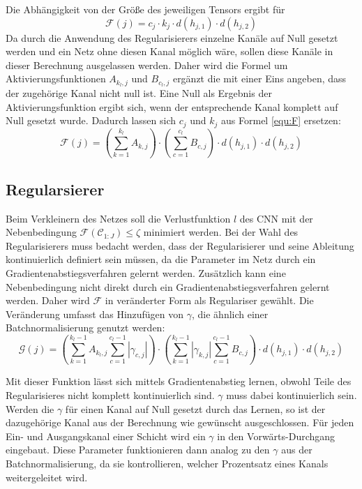 Die Abhängigkeit von der Größe des jeweiligen Tensors ergibt für 
\begin{equation}\label{equ:F}
\mathcal{F}(j)=c_j \cdot k_j \cdot d(h_{j,1}) \cdot d(h_{j,2})  
\end{equation}
Da durch die Anwendung des Regularisierers einzelne Kanäle auf Null gesetzt werden und ein Netz ohne diesen Kanal möglich wäre, sollen diese Kanäle in dieser Berechnung ausgelassen werden. Daher wird die Formel um Aktivierungsfunktionen $A_{k_l,j}$ und $B_{c_l,j}$ ergänzt die mit einer Eins angeben, dass der zugehörige Kanal nicht null ist. Eine Null als Ergebnis der Aktivierungsfunktion ergibt sich, wenn der entsprechende Kanal komplett auf Null gesetzt wurde. Dadurch lassen sich $c_j$ und $k_j $ aus Formel \ref{equ:F} ersetzen:
\begin{equation}
\mathcal{F}(j)=\left(\sum_{k=1}^{k_l} A_{k,j} \right) \cdot \left(\sum_{c=1}^{c_l} B_{c,j}\right) \cdot d(h_{j,1}) \cdot d(h_{j,2})  
\end{equation}


\subsection{Regularsierer}
Beim Verkleinern des Netzes soll die Verlustfunktion $l$ des CNN mit der Nebenbedingung $\mathcal{F}(\mathcal{C}_{1:J})\leq \zeta$ minimiert werden. Bei der Wahl des Regularisierers muss bedacht werden, dass der Regularisierer und seine Ableitung kontinuierlich definiert sein müssen, da die Parameter im Netz durch ein Gradientenabstiegsverfahren gelernt werden. Zusätzlich kann eine Nebenbedingung nicht direkt durch ein Gradientenabstiegsverfahren gelernt werden. Daher wird $\mathcal{F}$ in veränderter Form als Regulariser gewählt. Die Veränderung umfasst das Hinzufügen von $\gamma$, die ähnlich einer Batchnormalisierung genutzt werden:
\begin{equation}
\mathcal{G}(j)=\left(\sum_{k=1}^{k_l-1} A_{k_l,j} \sum_{c=1}^{c_l-1} |\gamma_{c, j} | \right) \cdot \left(\sum_{k=1}^{k_l-1} |\gamma_{k,j} |   \sum_{c=1}^{c_l-1} B_{c,j}\right) \cdot d(h_{j,1}) \cdot d(h_{j,2})  
\end{equation}

Mit dieser Funktion lässt sich mittels Gradientenabstieg lernen, obwohl Teile des Regularisieres nicht komplett kontinuierlich sind. $\gamma$ muss dabei kontinuierlich sein. Werden die $\gamma$ für einen Kanal auf Null gesetzt durch das Lernen, so ist der dazugehörige Kanal aus der Berechnung wie gewünscht ausgeschlossen. Für jeden Ein- und Ausgangskanal einer Schicht wird ein $\gamma$ in den Vorwärts-Durchgang eingebaut. Diese Parameter funktionieren dann analog zu den $\gamma$ aus der Batchnormalisierung, da sie kontrollieren, welcher Prozentsatz eines Kanals weitergeleitet wird.


